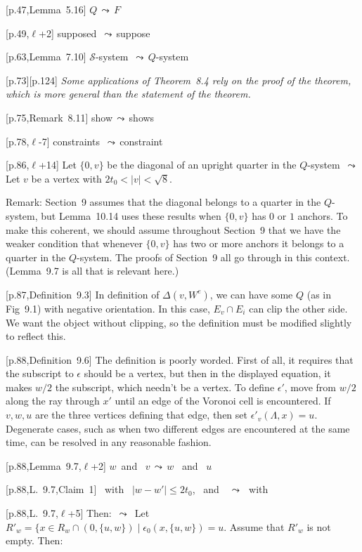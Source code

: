 \documentclass[11pt]{amsart}
\def\lto{\ensuremath{\,\leadsto\,}}
\def\line{$\ell$}
\def\text{\hbox}
\begin{document}
[p.47,Lemma~5.16] $Q\lto F$

[p.49,\line+2] supposed \lto suppose
	
[p.63,Lemma~7.10]
	${\mathcal S}$-system \lto $Q$-system
	
[p.73][p.124] {\it Some applications of Theorem~8.4 rely on
the proof of the theorem, which is more general than
the statement of the theorem.}

[p.75,Remark~8.11]
	show\lto shows

[p.78,\line-7] constraints \lto constraint

[p.86,\line+14] Let $\{0,v\}$ be 
          the diagonal of an upright quarter in the $Q$-system
        \lto
       Let $v$ be a vertex with $2t_0<|v|<\sqrt8$.
	
          Remark: Section~9 assumes that the diagonal belongs to
          a quarter in the $Q$-system, but Lemma~10.14 uses these
          results when $\{0,v\}$ has $0$ or $1$ anchors.  To make
          this coherent, we should assume throughout Section~9 that
          we have the weaker condition that whenever $\{0,v\}$ has
          two or more anchors it belongs to a quarter in the $Q$-system.
          The proofs of Section~9 all go through in this context.
          (Lemma~9.7 is all that is relevant here.)

[p.87,Definition~9.3]
	In definition of $\Delta(v,W^e)$, we
	can have some $Q$ (as in Fig~9.1)
	with negative orientation.
	In this case, $E_v\cap E_i$ can clip
	the other side.  We want the object
	without clipping, so the definition must
	be modified slightly to reflect this.
	
[p.88,Definition~9.6]
	The definition is poorly worded.  First of
	all, it requires that the subscript to
	$\epsilon$ should be a vertex, but then in
	the displayed equation, it makes $w/2$ the
	subscript, which needn't be a vertex.  To
	define $\epsilon'$, move from $w/2$ along
	the ray through $x'$ until an edge of the
	Voronoi cell is encountered.  If $v,w,u$
	are the three vertices defining that edge,
	then set $\epsilon'_v(\Lambda,x)=u$.
	Degenerate cases, such as when two different
	edges are encountered at the same time,
	can be resolved in any reasonable fashion.
	
[p.88,Lemma~9.7,\line+2] 
	$w$\text{ and } $v$\lto $w$ \text{ and } $u$

	
[p.88,L.~9.7,Claim~1]
	\text{ with } $|w - w'|\le 2t_0$, \text{ and }
	\lto \text{ with }

	
[p.88,L.~9.7,\line+5]
         Then: $\lto$ Let
          $
          R'_w = \{x\in R_w \cap(0,\{u,w\})\mid 
          \epsilon_0(x,\{u,w\}) = u.
          $
          Assume that $R'_w$ is not empty. Then:
\end{document}
